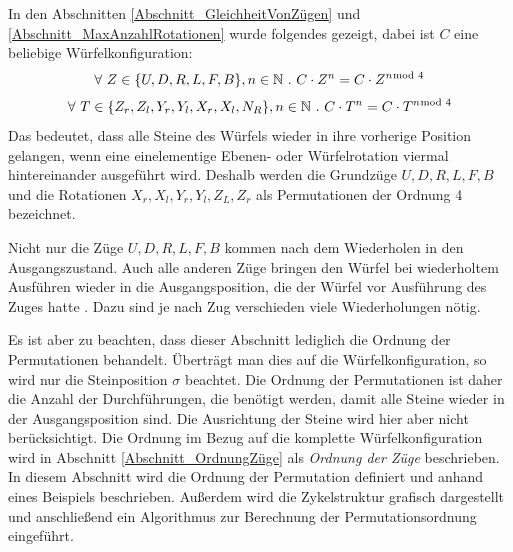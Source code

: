 \documentclass[12pt,a4paper, usenames, dvipsnames]{article}
\theoremstyle{mystyle}
\theoremstyle{definition}
\begin{document}
In den Abschnitten \ref{Abschnitt_GleichheitVonZügen} und \ref{Abschnitt_MaxAnzahlRotationen} wurde folgendes gezeigt, dabei ist $C$ eine beliebige Würfelkonfiguration:
\begin{align*}
\forall \ Z \in \{ U, D, R, L, F, B \}, n \in \mathbb{N} \ . \ C \cdot Z^n=C \cdot Z^{n \hspace*{-0.5em} \mod 4} 
\end{align*}
\vspace*{-3em}
\begin{align*}
\forall \ T \in \{{Z_r}, {Z_l}, {Y_r}, {Y_l}, {X_r}, {X_l}, N_R \}, n \in \mathbb{N} \ . \ C \cdot T^n=C \cdot T^{n \hspace*{-0.5em} \mod 4}
\end{align*}
Das bedeutet, dass alle Steine des Würfels wieder in ihre vorherige Position gelangen, wenn eine einelementige Ebenen- oder Würfelrotation viermal hintereinander ausgeführt wird. Deshalb werden die Grundzüge $U, D, R, L, F, B$ und die Rotationen $X_r, X_l, Y_r, Y_l, Z_L, Z_r$ als Permutationen der Ordnung 4 bezeichnet. 


Nicht nur die Züge $U, D, R, L, F, B$ kommen nach dem Wiederholen in den Ausgangszustand. Auch alle anderen Züge bringen den Würfel bei wiederholtem Ausführen wieder in die Ausgangsposition, die der Würfel vor Ausführung des Zuges hatte \cite{TD}. Dazu sind je nach Zug verschieden viele Wiederholungen nötig. 


Es ist aber zu beachten, dass dieser Abschnitt lediglich die Ordnung der Permutationen behandelt. Überträgt man dies auf die Würfelkonfiguration, so wird nur die Steinposition $\sigma$ beachtet. Die Ordnung der Permutationen ist daher die Anzahl der Durchführungen, die benötigt werden, damit alle Steine wieder in der Ausgangsposition sind. Die Ausrichtung der Steine wird hier aber nicht berücksichtigt. Die Ordnung im Bezug auf die komplette Würfelkonfiguration wird in Abschnitt \ref{Abschnitt_OrdnungZüge} als \textit{Ordnung der Züge} beschrieben. In diesem Abschnitt wird die Ordnung der Permutation definiert und anhand eines Beispiels beschrieben. Außerdem wird die Zykelstruktur grafisch dargestellt und anschließend ein Algorithmus zur Berechnung der Permutationsordnung eingeführt.


\end{document}
